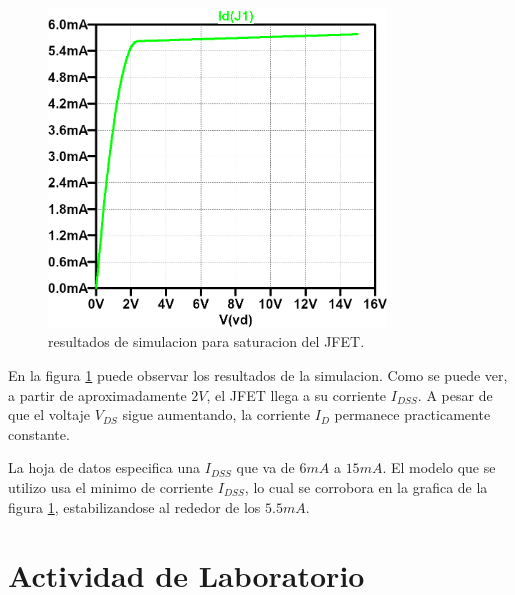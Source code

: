     \begin{figure}[!ht]
      \centering
      \includegraphics[width=0.8\textwidth]{images/saturacion-id_vds.png}
      \caption{resultados de simulacion para saturacion del JFET.}
      \label{fig:sim.sat}
    \end{figure}
    En la figura \ref{fig:sim.sat} puede observar los resultados de la simulacion. Como se puede ver, a partir de
    aproximadamente $2V$, el JFET llega a su corriente $I_{DSS}$. A pesar de que el voltaje $V_{DS}$ sigue aumentando, la
    corriente $I_D$ permanece practicamente constante.

    La hoja de datos especifica una $I_{DSS}$ que va de $6mA$ a $15mA$. El modelo que se utilizo usa el minimo de
    corriente $I_{DSS}$, lo cual se corrobora en la grafica de la figura \ref{fig:sim.sat}, estabilizandose al rededor
    de los $5.5mA$.

  \section{Actividad de Laboratorio}
